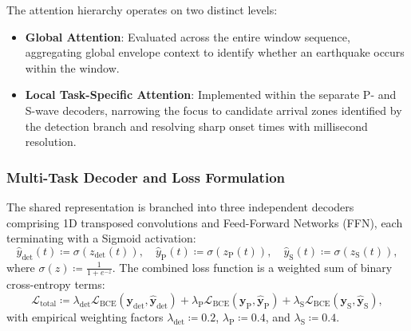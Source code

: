 The attention hierarchy operates on two distinct levels:
\begin{itemize}
  \item \textbf{Global Attention}: Evaluated across the entire
    window sequence, aggregating global envelope context to identify
    whether an earthquake occurs within the window.
  \item \textbf{Local Task-Specific Attention}: Implemented within
    the separate P- and S-wave decoders, narrowing the focus to
    candidate arrival zones identified by the detection branch and
    resolving sharp onset times with millisecond resolution.
\end{itemize}

\subsubsection{Multi-Task Decoder and Loss Formulation}
The shared representation is branched into three independent
decoders comprising 1D transposed convolutions and Feed-Forward
Networks (FFN), each terminating with a Sigmoid activation:
\begin{equation}
  \hat{y}_{\mathrm{det}}(t) \coloneqq
  \sigma\left(z_{\mathrm{det}}(t)\right), \quad
  \hat{y}_{\mathrm{P}}(t) \coloneqq \sigma\left(z_{\mathrm{P}}(t)\right),
  \quad \hat{y}_{\mathrm{S}}(t) \coloneqq \sigma\left(z_{\mathrm{S}}(t)\right),
\end{equation}
where $\sigma(z) \coloneqq \frac{1}{1 + e^{-z}}$. The combined loss function
is a weighted sum of binary cross-entropy terms:
\begin{equation}
  \mathcal{L}_{\mathrm{total}} \coloneqq \lambda_{\mathrm{det}}
  \mathcal{L}_{\mathrm{BCE}}(\mathbf{y}_{\mathrm{det}},
  \hat{\mathbf{y}}_{\mathrm{det}}) + \lambda_{\mathrm{P}}
  \mathcal{L}_{\mathrm{BCE}}(\mathbf{y}_{\mathrm{P}},
  \hat{\mathbf{y}}_{\mathrm{P}}) + \lambda_{\mathrm{S}}
  \mathcal{L}_{\mathrm{BCE}}(\mathbf{y}_{\mathrm{S}},
  \hat{\mathbf{y}}_{\mathrm{S}}),
\end{equation}
with empirical weighting factors $\lambda_{\mathrm{det}} \coloneqq \num{0.2}$,
$\lambda_{\mathrm{P}} \coloneqq \num{0.4}$, and
$\lambda_{\mathrm{S}} \coloneqq \num{0.4}$.

